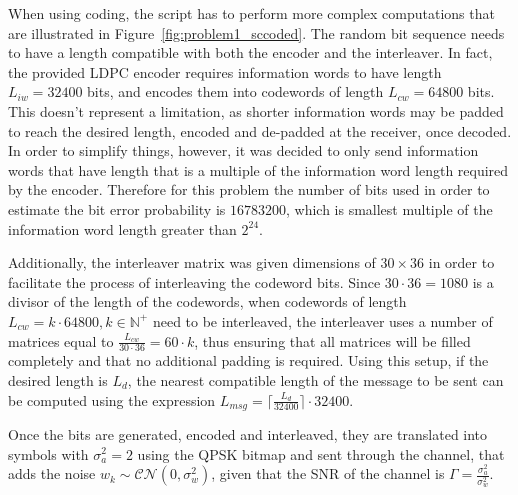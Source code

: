 \documentclass[10pt]{article}
\begin{document}
When using coding, the script has to perform more complex computations that are illustrated in Figure~\ref{fig:problem1_sccoded}. The random bit sequence needs to have a length compatible with both the encoder and the interleaver. In fact, the provided LDPC encoder requires information words to have length $L_{iw} = 32400$ bits, and encodes them into codewords of length $L_{cw} = 64800$ bits. This doesn't represent a limitation, as shorter information words may be padded to reach the desired length, encoded and de-padded at the receiver, once decoded. In order to simplify things, however, it was decided to only send information words that have length that is a multiple of the information word length required by the encoder. Therefore for this problem the number of bits used in order to estimate the bit error probability is $16783200$, which is smallest multiple of the information word length greater than $2^{24}$. 

Additionally, the interleaver matrix was given dimensions of $30 \times 36$ in order to facilitate the process of interleaving the codeword bits. Since $30 \cdot 36 = 1080$ is a divisor of the length of the codewords, when codewords of length $L_{cw} = k \cdot 64800, k \in \mathbb{N^{+}}$ need to be interleaved, the interleaver uses a number of matrices equal to $\frac{L_{cw}}{30\cdot36} = 60 \cdot k$, thus ensuring that all matrices will be filled completely and that no additional padding is required. Using this setup, if the desired length is $L_d$, the nearest compatible length of the message to be sent can be computed using the expression $L_{msg} = \lceil \frac{L_{d}}{32400} \rceil \cdot 32400$. 

Once the bits are generated, encoded and interleaved, they are translated into symbols with $\sigma_a^2 = 2$ using the QPSK bitmap and sent through the channel, that adds the noise $w_k \sim \mathcal{CN}(0, \sigma_w^2)$, given that the SNR of the channel is $\Gamma = \frac{\sigma_a^2}{\sigma_w^2}$. 
\end{document}
